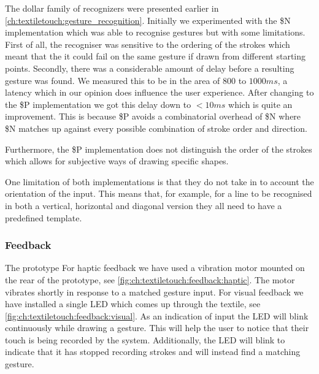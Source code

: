 The dollar family of recognizers were presented earlier in \ref{ch:textiletouch:gesture_recognition}.
Initially we experimented with the \$N implementation which was able to recognise gestures but with some limitations.
First of all, the recogniser was sensitive to the ordering of the strokes which meant that the it could fail on the same gesture if drawn from different starting points. 
Secondly, there was a considerable amount of delay before a resulting gesture was found.
We measured this to be in the area of \(800\) to \(1000 ms\), a latency which in our opinion does influence the user experience.
After changing to the \$P implementation we got this delay down to \(< 10 ms\) which is quite an improvement.
This is because \$P avoids a combinatorial overhead of \$N where \$N matches up against every possible combination of stroke order and direction.

Furthermore, the \$P implementation does not distinguish the order of the strokes which allows for subjective ways of drawing specific shapes.

One limitation of both implementations is that they do not take in to account the orientation of the input. 
This means that, for example, for a line to be recognised in both a vertical, horizontal and diagonal version they all need to have a predefined template. 

\subsubsection{Feedback} 

The prototype 
For haptic feedback we have used a vibration motor mounted on the rear of the prototype, see \ref{fig:ch:textiletouch:feedback:haptic}.
The motor vibrates shortly in response to a matched gesture input. 
For visual feedback we have installed a single LED which comes up through the textile, see \ref{fig:ch:textiletouch:feedback:visual}.
As an indication of input the LED will blink continuously while drawing a gesture.
This will help the user to notice that their touch is being recorded by the system.
Additionally, the LED will blink to indicate that it has stopped recording strokes and will instead find a matching gesture.

